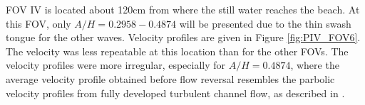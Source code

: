 \documentclass[review]{elsarticle}
\begin{document}
 FOV IV is located about 120cm from where the still water reaches the beach. At this FOV, only $A/H=0.2958-0.4874$ will be presented due to the thin swash tongue for the other waves. Velocity profiles are given in Figure \ref{fig:PIV_FOV6}. The velocity was less repeatable at this location than for the other FOVs. The velocity profiles were more irregular, especially for $A/H=0.4874$, where the average velocity profile obtained before flow reversal resembles the parbolic velocity profiles from fully developed turbulent channel flow, as described in \cite{white2006viscous}. %
\end{document}

